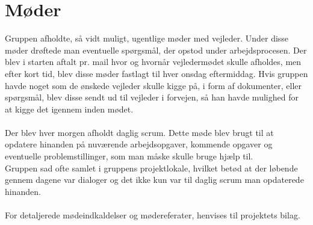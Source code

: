 \section{Møder}
Gruppen afholdte, så vidt muligt, ugentlige møder med vejleder. Under disse møder drøftede man eventuelle spørgsmål, der opstod under arbejdsprocesen.
Der blev i starten aftalt pr. mail hvor og hvornår vejledermødet skulle afholdes, men efter kort tid, blev disse møder fastlagt til hver onsdag eftermiddag.
Hvis gruppen havde noget som de ønskede vejleder skulle kigge på, i form af dokumenter, eller spørgsmål, blev disse sendt ud til vejleder i forvejen, så han havde mulighed for at kigge det igennem inden mødet. \\ \\
Der blev hver morgen afholdt daglig scrum. Dette møde blev brugt til at opdatere hinanden på nuværende arbejdsopgaver, kommende opgaver og eventuelle problemstillinger, som man måske skulle bruge hjælp til. \\
Gruppen sad ofte samlet i gruppens projektlokale, hvilket betød at der løbende gennem dagene var dialoger og det ikke kun var til daglig scrum man opdaterede hinanden. \\ \\
For detaljerede mødeindkaldelser og mødereferater, henvises til projektets bilag. \\

